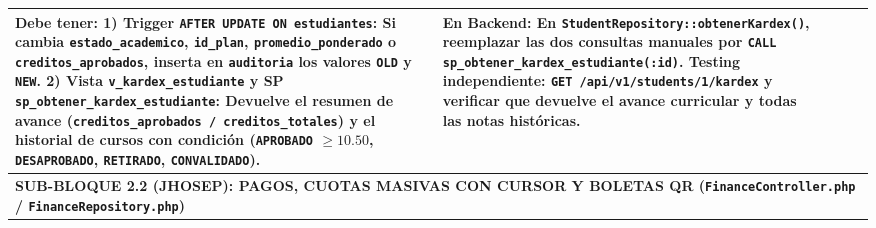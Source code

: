 \documentclass[10pt,a4paper,landscape]{article}
\begin{document}
\begin{longtable}{|p{0.5cm}|p{3.8cm}|p{2.9cm}|p{8.8cm}|p{9.2cm}|}
\textbf{Debe tener:}
1) \textbf{Trigger \texttt{AFTER UPDATE ON estudiantes}:} Si cambia \texttt{estado\_academico}, \texttt{id\_plan}, \texttt{promedio\_ponderado} o \texttt{creditos\_aprobados}, inserta en \texttt{auditoria} los valores \texttt{OLD} y \texttt{NEW}.
2) \textbf{Vista \texttt{v\_kardex\_estudiante} y SP \texttt{sp\_obtener\_kardex\_estudiante}:} Devuelve el resumen de avance (\texttt{creditos\_aprobados / creditos\_totales}) y el historial de cursos con condición (\texttt{APROBADO} $\ge 10.50$, \texttt{DESAPROBADO}, \texttt{RETIRADO}, \texttt{CONVALIDADO}). & 
\textbf{En Backend:} En \texttt{StudentRepository::obtenerKardex()}, reemplazar las dos consultas manuales por \texttt{CALL sp\_obtener\_kardex\_estudiante(:id)}.\newline
\textbf{Testing independiente:} \texttt{GET /api/v1/students/1/kardex} y verificar que devuelve el avance curricular y todas las notas históricas. \\
\hline

\multicolumn{5}{|l|}{\cellcolor{jhosepHeader}\textbf{\textcolor{unjbgNavy}{SUB-BLOQUE 2.2 (JHOSEP): PAGOS, CUOTAS MASIVAS CON CURSOR Y BOLETAS QR (\texttt{FinanceController.php} / \texttt{FinanceRepository.php})}}} \\
\hline


\end{longtable}
\end{document}

